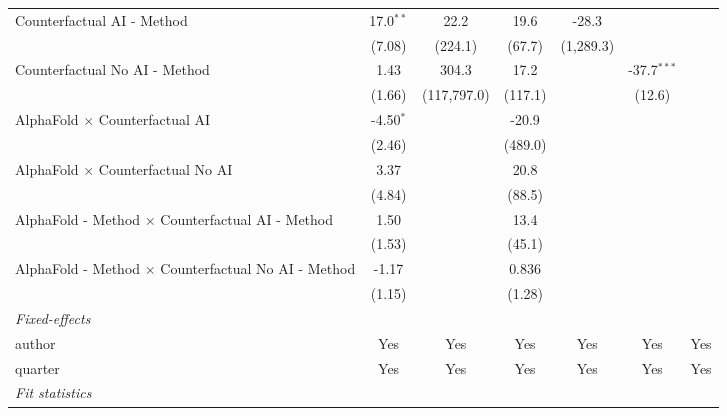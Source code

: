 \begin{tabular}{lcccccc}
   Counterfactual AI - Method                                 & 17.0$^{**}$ & 22.2        & 19.6    & -28.3     &                &   \\   
                                                              & (7.08)      & (224.1)     & (67.7)  & (1,289.3) &                &   \\   
   Counterfactual No AI - Method                              & 1.43        & 304.3       & 17.2    &           & -37.7$^{***}$  &   \\   
                                                              & (1.66)      & (117,797.0) & (117.1) &           & (12.6)         &   \\   
   AlphaFold $\times$ Counterfactual AI                       & -4.50$^{*}$ &             & -20.9   &           &                &   \\   
                                                              & (2.46)      &             & (489.0) &           &                &   \\   
   AlphaFold $\times$ Counterfactual No AI                    & 3.37        &             & 20.8    &           &                &   \\   
                                                              & (4.84)      &             & (88.5)  &           &                &   \\   
   AlphaFold - Method $\times$ Counterfactual AI - Method     & 1.50        &             & 13.4    &           &                &   \\   
                                                              & (1.53)      &             & (45.1)  &           &                &   \\   
   AlphaFold - Method $\times$ Counterfactual No AI - Method  & -1.17       &             & 0.836   &           &                &   \\   
                                                              & (1.15)      &             & (1.28)  &           &                &   \\   
   \midrule
   \emph{Fixed-effects}\\
   author                                                     & Yes         & Yes         & Yes     & Yes       & Yes            & Yes\\  
   quarter                                                    & Yes         & Yes         & Yes     & Yes       & Yes            & Yes\\  
   \midrule
   \emph{Fit statistics}\\

\end{tabular}
